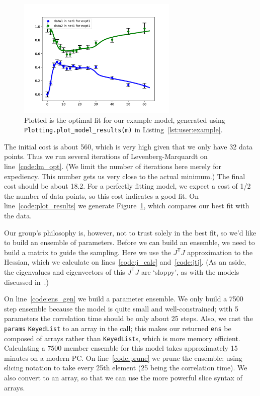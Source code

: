 \documentclass[12pt]{article}
\makeatletter
\newcommand{\transpose}[1]{\ensuremath{{#1}^\mathsf{T}}}
\newcommand{\JtJ}{\ensuremath{\transpose{J}\!J}\xspace}
\newcommand{\py}[1]{\lstinline[language=Python, showstringspaces=False]@#1@}
\makeatother
\begin{document}
\begin{figure}
\begin{center}
\includegraphics[width=3in]{../../Example/JAK-STAT/model_results}
\end{center}
\caption[Optimal fit for JAK-STAT example]{Plotted is the optimal fit for our example model, generated using \py{Plotting.plot_model_results(m)} in Listing~\ref{lst:user:example}.\label{fig:user:model_results}}
\end{figure}

The initial cost is about 560, which is very high given that we only have 32 data points.
Thus we run several iterations of Levenberg-Marquardt on line~\ref{code:lm_opt}.
(We limit the number of iterations here merely for expediency. This number gets us very close to the actual minimum.)
The final cost should be about 18.2. For a perfectly fitting model, we expect a cost of 1/2 the number of data points, so this cost indicates a good fit.
On line~\ref{code:plot_results} we generate Figure~\ref{fig:user:model_results}, which compares our best fit with the data.

Our group's philosophy is, however, not to trust solely in the best fit, so we'd like to build an ensemble of parameters.
Before we can build an ensemble, we need to build a matrix to guide the sampling.
Here we use the \JtJ approximation to the Hessian, which we calculate on lines~\ref{code:j_calc} and~\ref{code:jtj}.
(As an aside, the eigenvalues and eigenvectors of this \JtJ are `sloppy', as with the models discussed in~\cite{bib:Brown2003a, bib:Waterfall2006, bib:Gutenkunst2007}.)

On line~\ref{code:ens_gen} we build a parameter ensemble.
We only build a 7500 step ensemble because the model is quite small and well-constrained; with 5 parameters the correlation time should be only about 25 steps.
Also, we cast the \py{params} \py{KeyedList} to an array in the call; this makes our returned \py{ens} be composed of arrays rather than \py{KeyedList}s, which is more memory efficient.
Calculating a 7500 member ensemble for this model takes approximately 15 minutes on a modern PC.
On line~\ref{code:prune} we prune the ensemble; using slicing notation to take every 25th element (25 being the correlation time).
We also convert to an array, so that we can use the more powerful slice syntax of arrays.
\end{document}

